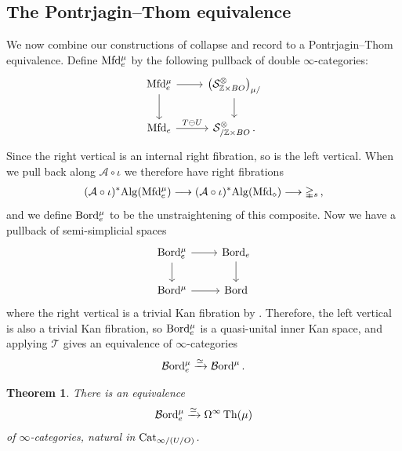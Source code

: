 \documentclass[10pt]{amsart}
\numberwithin{equation}{section}
\newtheorem{theorem}[prop]{Theorem}
\theoremstyle{definition}
\DeclareMathOperator{\Th}{Th}
\newcommand{\Bord}{\mathcal{B}\mathrm{ord}\vphantom{d}}
\newcommand{\PreBord}{\mathrm{Bord}\vphantom{d}}
\newcommand{\Cat}{\mathrm{Cat}\vphantom{t}}
\newcommand{\Mfd}{\mathrm{Mfd}\vphantom{d}}
\newcommand{\Alg}{\mathrm{Alg}\vphantom{z}}
\newcommand{\bZ}{\mathbb{Z}}
\newcommand{\Simp}{\mathbb{\Delta}}
\newcommand{\cA}{\mathcal{A}}
\newcommand{\cS}{\mathcal{S}}
\newcommand{\cT}{\mathcal{T}}
\renewcommand{\to}{\mathchoice{\longrightarrow}{\rightarrow}{}{}}
\begin{document}
\subsection{The Pontrjagin--Thom equivalence}\label{subsec:pontrjagin-thom}
We now combine our constructions of collapse and record to a Pontrjagin--Thom equivalence.
Define $\Mfd_{e}^{\mu}$ by the following pullback of double $\infty$-categories:
\begin{equation*}
	\begin{tikzcd}
		\Mfd_{e}^{\mu} \arrow[r] \arrow[d] & \left(\cS_{\bZ\times BO}^{\otimes} \right)_{\mu/}  \arrow[d] \\
		\Mfd_{e} \arrow[r, "T\ominus U"]  & \cS_{/\bZ\times BO}^{\otimes} \, .
	\end{tikzcd}
\end{equation*}
Since the right vertical is an internal right fibration, so is the left vertical.
When we pull back along $\cA\circ \iota$ we therefore have right fibrations
\begin{align*}
	(\cA\circ\iota)^{*}\Alg(\Mfd_{e}^{\mu}) \to (\cA\circ \iota)^{*}\Alg(\Mfd_{\diamond}) \to \Simp_{s} \,,
\end{align*}
and we define $\PreBord_{e}^{\mu}$ to be the unstraightening of this composite.
Now we have a pullback of semi-simplicial spaces
\begin{equation*}
	\begin{tikzcd}
		\PreBord_{e}^{\mu} \arrow[r] \arrow[d] & \PreBord_{e} \arrow[d] \\
		\PreBord^{\mu} \arrow[r] & \PreBord
	\end{tikzcd}
\end{equation*}
where the right vertical is a trivial Kan fibration by .
Therefore, the left vertical is also a trivial Kan fibration, so $\PreBord_{e}^{\mu}$ is a quasi-unital inner Kan space, and applying $\cT$ gives an equivalence of $\infty$-categories
\begin{align*}
	\Bord_{e}^{\mu} \xrightarrow{\simeq} \Bord^{\mu} \,.
\end{align*}
\begin{theorem}
	There is an equivalence
	\begin{align*}
		\Bord^{\mu}_{e} \xrightarrow{\simeq} \Omega^{\infty}\Th(\mu)
	\end{align*}
	of $\infty$-categories, natural in $\Cat_{\infty /(U/O)}$.
\end{theorem}
\end{document}
